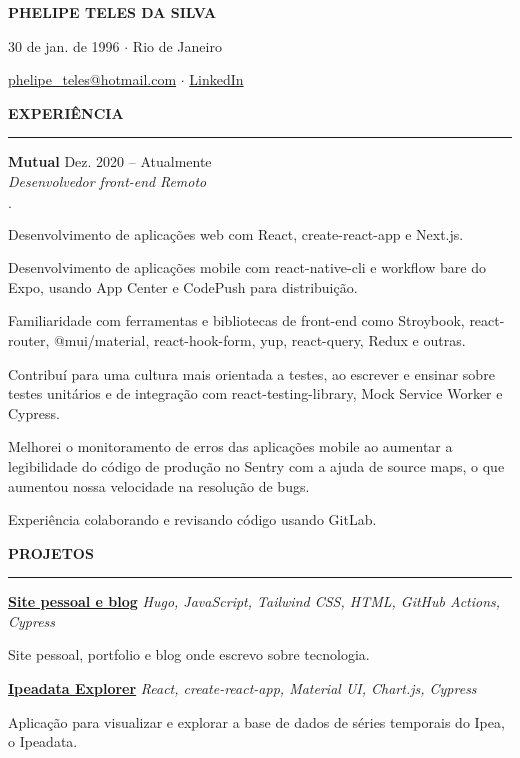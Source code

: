 \documentclass[11pt,letterpaper]{article}
\newenvironment{tightlist}
  {\begin{list}
    {$\cdot$}
    {
      \setlength{\leftmargin}{0em}
      \setlength{\itemsep}{-\smallskipamount}
    }
  }
{\end{list}}
\begin{document}
\pagestyle{empty}

\centerline{\huge\bf PHELIPE TELES DA SILVA}
\medskip

\centerline{30 de jan. de 1996 $\cdot$ Rio de Janeiro}
\smallskip

\centerline{
  \href{mailto:phelipe_teles@hotmail.com}{phelipe\_teles@hotmail.com}
  $\cdot$
  \href{https://linkedin.com/in/phelipeteles}{LinkedIn}
}
\smallskip

\medskip \textbf{EXPERIÊNCIA} \medskip
\hrule

\textbf{Mutual} \hfill Dez. 2020 -- Atualmente \\
\emph{Desenvolvedor front-end} \hfill \emph{Remoto} {\parfillskip=0pt\par}

\begin{tightlist}
  \item Desenvolvimento de aplicações web com React, create-react-app e Next.js.
  \item Desenvolvimento de aplicações mobile com react-native-cli e workflow bare do
    Expo, usando App Center e CodePush para distribuição.
  \item Familiaridade com ferramentas e bibliotecas de front-end como
    Stroybook, react-router, @mui/material, react-hook-form, yup,
    react-query, Redux e outras.
  \item Contribuí para uma cultura mais orientada a testes, ao escrever e
    ensinar sobre testes unitários e de integração com
    react-testing-library, Mock Service Worker e Cypress.
  \item Melhorei o monitoramento de erros das aplicações mobile ao aumentar a
    legibilidade do código de produção no Sentry com a ajuda de source
    maps, o que aumentou nossa velocidade na resolução de bugs.
  \item Experiência colaborando e revisando código usando GitLab.
\end{tightlist}

\medskip \textbf{PROJETOS} \medskip
\hrule

\textbf{\href{https://phelipetls.github.io}{Site pessoal e blog}} \hfill \emph{Hugo, JavaScript, Tailwind CSS, HTML, GitHub Actions, Cypress}
{\parfillskip=0pt\par}
Site pessoal, portfolio e blog onde escrevo sobre tecnologia.

\smallskip

\textbf{\href{http://ipeadata-explorer.surge.sh}{Ipeadata Explorer}} \hfill \emph{React, create-react-app, Material UI, Chart.js, Cypress}
{\parfillskip=0pt\par}
Aplicação para visualizar e explorar a base de dados de séries temporais do Ipea, o Ipeadata.
\end{document}
